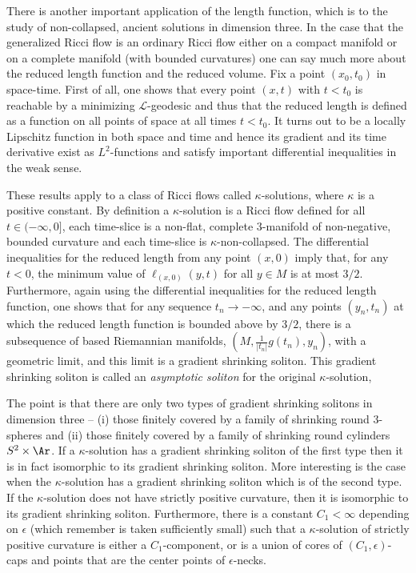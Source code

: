 There is another important application of the length function, which
is to the study of non-collapsed, ancient solutions in dimension three. In the case that the generalized Ricci
flow is an ordinary Ricci flow either on a compact manifold or on a
complete manifold (with bounded curvatures) one can say much more
about the reduced length function and the reduced volume. Fix a
point $(x_0,t_0)$ in space-time. First of all, one shows that every
point $(x,t)$ with $t<t_0$ is reachable by a minimizing ${\mathcal
L}$-geodesic and thus that the reduced length is defined as a
function on all points of space at all times $t<t_0$. It turns out
to be a locally Lipschitz function in both space and time and hence
its gradient and its time derivative exist as $L^2$-functions and
satisfy important differential inequalities in the weak sense.

These results apply to a class of Ricci flows called
$\kappa$-solutions, where $\kappa$ is a
positive constant. By definition a $\kappa$-solution is a Ricci flow
defined for all $t\in (-\infty,0]$, each time-slice is a non-flat,
complete $3$-manifold of non-negative, bounded curvature and each
time-slice is $\kappa$-non-collapsed. The differential inequalities
for the reduced length from any point $(x,0)$ imply that, for any
$t<0$, the minimum value of $\ell_{(x,0)}(y,t)$ for all $y\in M$ is
at most $3/2$. Furthermore, again using the differential
inequalities for the reduced length function, one shows that for any
sequence $t_n\rightarrow -\infty$, and any points $(y_n,t_n)$ at
which the reduced length function is bounded above by $3/2$, there
is a subsequence of based Riemannian manifolds,
$(M,\frac{1}{|t_n|}g(t_n),y_n)$, with a geometric limit, and this
limit is a gradient shrinking soliton. This gradient shrinking
soliton is called an {\em asymptotic
soliton} for the
original $\kappa$-solution, 




The point is that there are only two types of gradient shrinking
solitons in dimension three -- (i) those finitely covered by a
family of shrinking round $3$-spheres and (ii) those finitely
covered by a family of shrinking round cylinders $S^2\times \Ar$. If
a $\kappa$-solution has a gradient shrinking soliton of the first
type then it is in fact isomorphic to its gradient shrinking
soliton. More interesting is the case when the $\kappa$-solution has
a gradient shrinking soliton which is of the second type. If the
$\kappa$-solution does not have strictly positive curvature, then it
is isomorphic to its gradient shrinking soliton. Furthermore, there
is a constant $C_1<\infty$ depending on $\epsilon$ (which remember
is taken sufficiently small) such that a $\kappa$-solution of
strictly positive curvature is either a $C_1$-component, or is a
union of cores of $(C_1,\epsilon)$-caps and points that are the
center points of $\epsilon$-necks.

